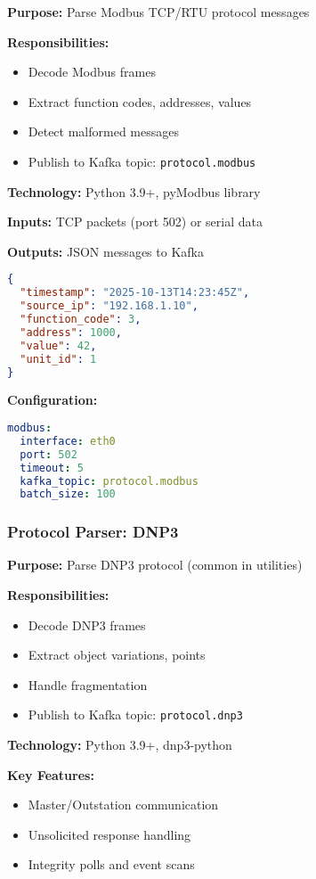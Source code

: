 \documentclass[12pt,a4paper]{article}
\begin{document}
\textbf{Purpose:} Parse Modbus TCP/RTU protocol messages

\textbf{Responsibilities:}
\begin{itemize}[leftmargin=1cm,itemsep=0pt]
    \item Decode Modbus frames
    \item Extract function codes, addresses, values
    \item Detect malformed messages
    \item Publish to Kafka topic: \texttt{protocol.modbus}
\end{itemize}

\textbf{Technology:} Python 3.9+, pyModbus library

\textbf{Inputs:} TCP packets (port 502) or serial data

\textbf{Outputs:} JSON messages to Kafka
\begin{lstlisting}[language=json]
{
  "timestamp": "2025-10-13T14:23:45Z",
  "source_ip": "192.168.1.10",
  "function_code": 3,
  "address": 1000,
  "value": 42,
  "unit_id": 1
}
\end{lstlisting}

\textbf{Configuration:}
\begin{lstlisting}[language=yaml]
modbus:
  interface: eth0
  port: 502
  timeout: 5
  kafka_topic: protocol.modbus
  batch_size: 100
\end{lstlisting}

\subsubsection{Protocol Parser: DNP3}

\textbf{Purpose:} Parse DNP3 protocol (common in utilities)

\textbf{Responsibilities:}
\begin{itemize}[leftmargin=1cm,itemsep=0pt]
    \item Decode DNP3 frames
    \item Extract object variations, points
    \item Handle fragmentation
    \item Publish to Kafka topic: \texttt{protocol.dnp3}
\end{itemize}

\textbf{Technology:} Python 3.9+, dnp3-python

\textbf{Key Features:}
\begin{itemize}[leftmargin=1cm,itemsep=0pt]
    \item Master/Outstation communication
    \item Unsolicited response handling
    \item Integrity polls and event scans
\end{itemize}
\end{document}
